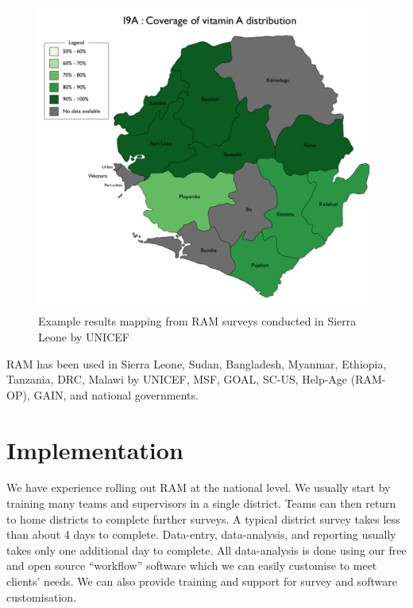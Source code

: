 \documentclass[12pt,a4paper]{article}
\begin{document}
\begin{figure}[H]

{\centering \includegraphics[width=0.7\linewidth]{figures/i9a} 

}

\caption{Example results mapping from RAM surveys conducted in Sierra Leone by UNICEF}\label{fig:sampleResults13}
\end{figure}

RAM has been used in Sierra Leone, Sudan, Bangladesh, Myanmar, Ethiopia, Tanzania, DRC, Malawi by UNICEF, MSF, GOAL, SC-US, Help-Age (RAM-OP), GAIN, and national governments.

\newpage

\hypertarget{implementation}{%
\section{Implementation}\label{implementation}}

We have experience rolling out RAM at the national level. We usually start by training many teams and supervisors in a single district. Teams can then return to home districts to complete further surveys. A typical district survey takes less than about 4 days to complete. Data-entry, data-analysis, and reporting usually takes only one additional day to complete. All data-analysis is done using our free and open source ``workflow'' software which we can easily customise to meet clients' needs. We can also provide training and support for survey and software customisation.
\end{document}
